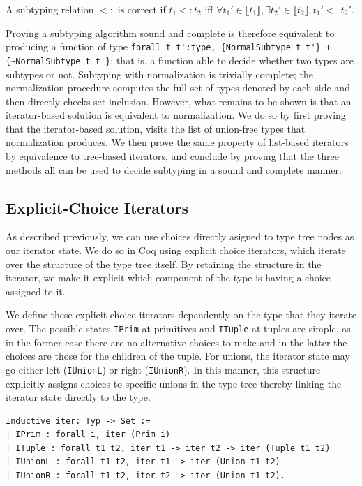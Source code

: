 \documentclass[a4paper,english]{lipics-v2019}
\newcommand{\denotes}[1]{\llbracket #1 \rrbracket}
\begin{document}
\begin{definition}
A subtyping relation $<:$ is correct if $t_1 <: t_2$ iff $\forall t_1' \in \denotes{t_1},
\exists t_2' \in \denotes{t_2}, t_1' <: t_2'$.
\label{dfn:scr}
\end{definition}

\noindent
Proving a subtyping algorithm sound and complete is therefore equivalent to
producing a function of type
\verb|forall t t':type, {NormalSubtype t t'} + {~NormalSubtype t t'}|; that
is, a function able to decide whether two types are subtypes or not.
Subtyping with normalization is trivially complete; the normalization
procedure computes the full set of types denoted by each side and then
directly checks set inclusion.  However, what remains to be shown is that an
iterator-based solution is equivalent to normalization. We do so by first
proving that the iterator-based solution, visits the list of union-free
types that normalization produces. We then prove the same property of
list-based iterators by equivalence to tree-based iterators, and conclude by
proving that the three methods all can be used to decide subtyping in a
sound and complete manner.

\subsection{Explicit-Choice Iterators}

As described previously, we can use choices directly asigned to type tree
nodes as our iterator state. We do so in Coq using explicit choice iterators,
which iterate over the structure of the type tree itself. By retaining the
structure in the iterator, we make it explicit which component of the type is
having a choice assigned to it.

We define these explicit choice iterators dependently on the type that they
iterate over. The possible states \verb|IPrim| at primitives and \verb|ITuple|
at tuples are simple, as in the former case there are no alternative choices
to make and in the latter the choices are those for the children of the tuple.
For unions, the iterator state  may go either left (\verb|IUnionL|) or right
(\verb|IUnionR|). In this manner, this structure explicitly assigns choices to
specific unions in the type tree thereby linking the iterator state directly
to the type.

\begin{small}\begin{verbatim}
Inductive iter: Typ -> Set :=
| IPrim : forall i, iter (Prim i)
| ITuple : forall t1 t2, iter t1 -> iter t2 -> iter (Tuple t1 t2)
| IUnionL : forall t1 t2, iter t1 -> iter (Union t1 t2)
| IUnionR : forall t1 t2, iter t2 -> iter (Union t1 t2).
\end{verbatim}\end{small}
\end{document}
